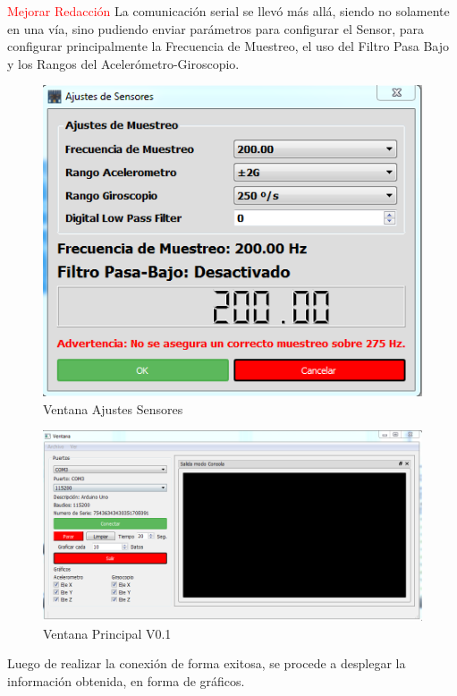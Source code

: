 \documentclass[12pt,a4paper]{article}
\begin{document}
\textcolor{red}{Mejorar Redacción}
La comunicación serial se llevó más allá, siendo no solamente en una vía, sino pudiendo enviar parámetros para configurar el Sensor, para configurar principalmente la Frecuencia de Muestreo, el uso del Filtro Pasa Bajo y los Rangos del Acelerómetro-Giroscopio.

\begin{figure}[H]
\centering
  \includegraphics[scale=0.6]{images/AjustesSensores}
  \caption{Ventana Ajustes Sensores}
  \label{fig:ajustessensores}
\end{figure}


\begin{figure}[H]
\centering
  \includegraphics[scale=0.6]{images/mainwindow}
  \caption{Ventana Principal V0.1}
  \label{fig:mainwindow}
\end{figure}

Luego de realizar la conexión de forma exitosa, se procede a desplegar la información obtenida, en forma de gráficos.
\end{document}
